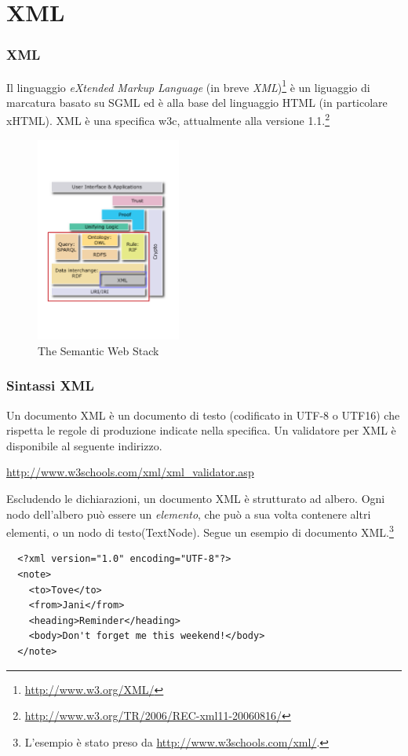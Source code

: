 \documentclass[8pt]{beamer}
\begin{document}
\section{XML}
\begin{frame}
	\frametitle{XML}
	 Il linguaggio \emph{eXtended Markup Language} (in breve \emph{XML})\footnote{\url{http://www.w3.org/XML/}} 
 \`e un liguaggio di marcatura basato su SGML ed \`e alla base del 
 linguaggio HTML (in particolare xHTML). XML \`e una specifica
 w3c, attualmente alla versione 1.1.\footnote{\url{http://www.w3.org/TR/2006/REC-xml11-20060816/}}
	
	\begin{figure}
	    \includegraphics[width=180px]{imgs/Semantic_Web_Stack_xml.png}
	    \caption{The Semantic Web Stack} 
	\end{figure}
\end{frame}

\begin{frame}[fragile]
	\frametitle{Sintassi XML}
 Un documento XML \`e un documento di testo (codificato in UTF-8 o UTF16) 
 che rispetta le regole di produzione indicate nella specifica. 
 Un validatore per XML \`e disponibile al seguente indirizzo.
\begin{center}
\begin{small}
  \url{http://www.w3schools.com/xml/xml_validator.asp}
\end{small} 
\end{center}
 \vspace{\baselineskip}

 Escludendo le dichiarazioni, un documento XML \`e strutturato ad albero.
 Ogni nodo dell'albero pu\`o essere un \emph{elemento}, che pu\`o
 a sua volta contenere altri elementi, o un nodo di testo(TextNode).
 Segue un esempio di documento XML.\footnote{L'esempio \`e stato preso da
 \url{http://www.w3schools.com/xml/}.}
 \begin{verbatim}
  <?xml version="1.0" encoding="UTF-8"?>
  <note>
    <to>Tove</to>
    <from>Jani</from>
    <heading>Reminder</heading>
    <body>Don't forget me this weekend!</body>
  </note>  
 \end{verbatim}
\end{frame}
\end{document}
